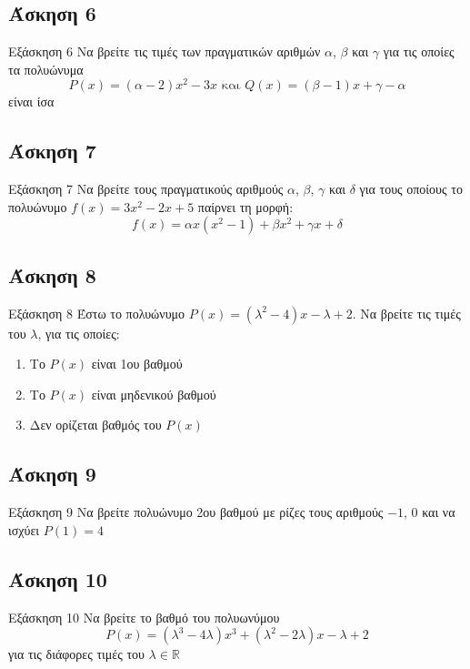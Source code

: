\documentclass[greek]{beamer}
\begin{document}
\subsection{Άσκηση 6}
\begin{frame}[label=Άσκηση6]{Εξάσκηση 6}
 Να βρείτε τις τιμές των πραγματικών αριθμών $α$, $β$ και $γ$ για τις οποίες τα πολυώνυμα
 $$P(x)=(α-2)x^2-3x \text{ και } Q(x)=(β-1)x+γ-α$$
 είναι ίσα

\end{frame}

\subsection{Άσκηση 7}
\begin{frame}[label=Άσκηση7]{Εξάσκηση 7}
 Να βρείτε τους πραγματικούς αριθμούς $α$, $β$, $γ$ και $δ$ για τους οποίους το πολυώνυμο $f(x)=3x^2-2x+5$ παίρνει τη μορφή:
 $$f(x)=αx(x^2-1)+βx^2+γx+δ$$

\end{frame}

\subsection{Άσκηση 8}
\begin{frame}[label=Άσκηση8]{Εξάσκηση 8}
 Έστω το πολυώνυμο $P(x)=(λ^2-4)x-λ+2$. Να βρείτε τις τιμές του $λ$, για τις οποίες:
 \begin{enumerate}
  \item<1-> Το $P(x)$ είναι 1ου βαθμού
  \item<2-> Το $P(x)$ είναι μηδενικού βαθμού
  \item<3-> Δεν ορίζεται βαθμός του $P(x)$
 \end{enumerate}

\end{frame}

\subsection{Άσκηση 9}
\begin{frame}[label=Άσκηση9]{Εξάσκηση 9}
 Να βρείτε πολυώνυμο 2ου βαθμού με ρίζες τους αριθμούς $-1$, $0$ και να ισχύει $P(1)=4$

\end{frame}

\subsection{Άσκηση 10}
\begin{frame}[label=Άσκηση10]{Εξάσκηση 10}
 Να βρείτε το βαθμό του πολυωνύμου
 $$P(x)=(λ^3-4λ)x^3+(λ^2-2λ)x-λ+2$$
 για τις διάφορες τιμές του $λ\in\mathbb{R}$

\end{frame}
\end{document}
